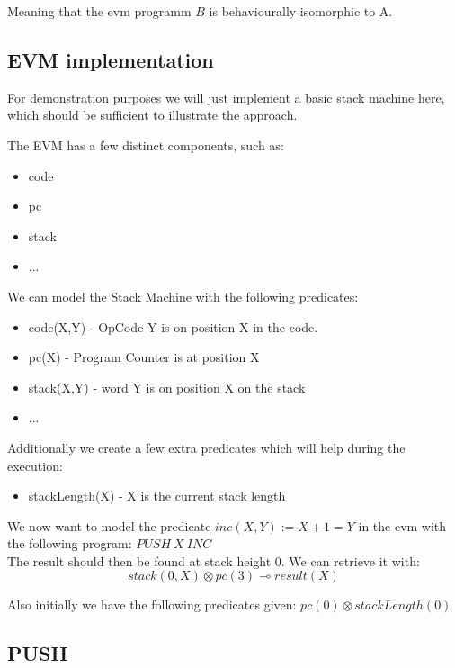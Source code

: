 \documentclass[sigconf]{acmart}
\begin{document}

Meaning that the evm programm $B$ is behaviourally isomorphic to A.

\subsection*{EVM implementation}
For demonstration purposes we will just implement a basic stack machine here, which should be sufficient to illustrate the approach.

The EVM has a few distinct components, such as:

\begin{itemize}
  \item code
  \item pc
  \item stack
  \item ...
\end{itemize}


We can model the Stack Machine with the following predicates:

\begin{itemize}
  \item code(X,Y) - OpCode Y is on position X in the code.
  \item pc(X) - Program Counter is at position X
  \item stack(X,Y) - word Y is on position X on the stack
  \item ...
\end{itemize}


Additionally we create a few extra predicates which will help during the execution:
\begin{itemize}
  \item stackLength(X) - X is the current stack length
\end{itemize}

We now want to model the predicate $inc(X,Y) := X + 1 = Y$ in the evm with the following program: $PUSH\ X\ INC$\\ The result should then be found at stack height 0. We can retrieve it with:
\[ stack(0, X) \otimes pc(3) \multimap result(X) \]


Also initially we have the following predicates given:
$pc(0) \otimes stackLength(0)$

\subsection*{PUSH}
\end{document}
